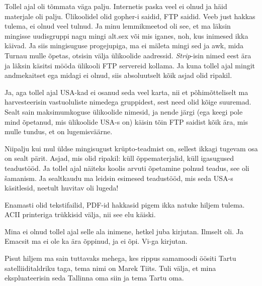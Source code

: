 
Tollel ajal oli tõmmata väga palju. Internetis paska veel ei olnud ja häid 
materjale oli palju. Ülikoolidel olid gopher-i saidid, FTP saidid. Veeb just 
hakkas tulema, ei olnud veel tulnud. Ja minu lemmikmeetod oli see, et ma läksin 
mingisse uudisgruppi nagu mingi alt.sex või mis iganes, noh, kus inimesed ikka 
käivad. Ja siis mingisuguse progejupiga, ma ei mäleta mingi sed ja awk, mida 
Turnau mulle õpetas, otsisin välja  ülikoolide 
aadressid. \emph{Strip}-isin nimed eest ära ja läksin käsitsi mööda ülikooli 
FTP servereid kollama. Ja kuna tollel ajal mingit andmekaitset ega midagi ei 
olnud, siis absoluutselt kõik asjad olid ripakil. 


Ja, aga tollel ajal USA-kad ei osanud seda veel karta, nii et põhimõtteliselt 
ma harvesteerisin vastuoluliste nimedega gruppidest, sest need olid kõige 
suuremad. Sealt sain maksimumkoguse ülikoolide nimesid, ja nende järgi (ega 
keegi pole mind õpetanud, mis ülikoolide USA-s on) käisin tõin FTP saidist kõik 
 ära, mis mulle tundus, et on lugemisväärne.


Niipalju kui mul üldse mingisugust krüpto-teadmist on, sellest ikkagi tugevam 
osa on sealt pärit. Asjad, mis olid ripakil: küll õppematerjalid, küll 
igasugused teadustööd. Ja tollel ajal näiteks koolis arvuti õpetamine polnud 
teadus, see oli šamanism. Ja sealtkaudu ma leidsin esimesed teadustööd, mis 
seda USA-s käsitlesid, neetult huvitav oli lugeda! 


Enamasti olid tekstifailid, PDF-id hakkasid pigem ikka natuke hiljem tulema. 
ACII printeriga trükkisid välja, nii see elu käiski. 


Mina ei olnud tollel ajal selle ala inimene, hetkel juba kirjutan. Ilmselt oli. 
Ja Emacsit ma ei ole ka ära õppinud, ja ei õpi. Vi-ga kirjutan. 

Pisut hiljem ma sain tuttavaks mehega, kes rippus samamoodi öösiti Tartu 
satelliiditaldriku taga, tema nimi on Marek Tiits. 
Tuli välja, et mina ekspluateerisin  seda Tallinna oma siin ja tema Tartu oma. 

